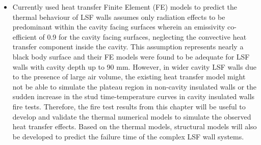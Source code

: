 \begin{itemize}
	\item Currently used heat transfer Finite Element (FE) models to predict the thermal behaviour of LSF walls assumes only radiation effects to be predominant within the cavity facing surfaces wherein an emissivity co-efficient of 0.9 for the cavity facing surfaces, neglecting the convective heat transfer component inside the cavity. This assumption represents nearly a black body surface and their FE models were found to be adequate for LSF walls with cavity depth up to 90 mm. However, in wider cavity LSF walls due to the presence of large air volume, the existing heat transfer model might not be able to simulate the plateau region in non-cavity insulated walls or the sudden increase in the stud time-temperature curves in cavity insulated walls fire tests. Therefore, the fire test results from this chapter will be useful to develop and validate the thermal numerical models to simulate the observed heat transfer effects. Based on the thermal models, structural models will also be developed to predict the failure time of the complex LSF wall systems. 
\end{itemize}








